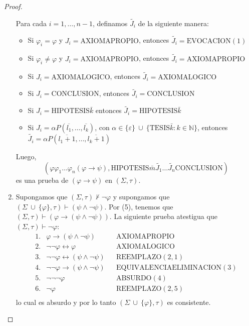 \begin{proof}
\begin{enumerate}[(1)]
        \PN Para cada $i = 1, \dotsc, n-1$, definamos $\widetilde{J_{i}}$ de la siguiente manera:
        \begin{itemize}
          \item Si $\varphi_{i} = \varphi $ y $J_{i} = \mathrm{AXIOMAPROPIO}$, entonces $\widetilde{J_{i}} =
            \mathrm{EVOCACION}(1)$
          \item Si $\varphi_{i}\neq \varphi $ y $J_{i} = \mathrm{AXIOMAPROPIO}$, entonces $\widetilde{J_{i}} =
            \mathrm{AXIOMAPROPIO}$
          \item Si $J_{i} = \mathrm{AXIOMALOGICO}$, entonces $\widetilde{J_{i}}= \mathrm{AXIOMALOGICO}$
          \item Si $J_{i} = \mathrm{CONCLUSION}$, entonces $\widetilde{J_{i}} = \mathrm{CONCLUSION}$
          \item Si $J_{i} = \mathrm{HIPOTESIS}\bar{k}$ entonces $\widetilde{J_{i}}= \mathrm{HIPOTESIS}\bar{k}$
          \item Si $J_{i} = \alpha P(\overline{l_{1}}, \dotsc, \overline{l_{k}})$, con $\alpha \in \{\varepsilon\}
            \ \cup \ \{\mathrm{TESIS}\bar{k}: k \in \mathbb{N}\}$, entonces $\widetilde{J_{i}} = \alpha
            P(\overline{l_{1}+1}, \dotsc, \overline{l_{k}+1})$
        \end{itemize}

        \PN Luego,
        \[
          (\varphi \varphi_{1} \dotsc \varphi_{n} (\varphi \rightarrow \psi), \text{HIPOTESIS}\bar{m} \widetilde{J_{1}}
          \dotsc \widetilde{J_{n}} \text{CONCLUSION})
        \]
        \PN es una prueba de $(\varphi \rightarrow \psi)$ en $(\Sigma, \tau)$.

      \item Supongamos que $(\Sigma, \tau) \not\vdash \lnot \varphi$ y supongamos que $(\Sigma \ \cup \ \{\varphi\},
        \tau) \vdash (\psi \wedge \lnot \psi)$. Por (5), tenemos que $(\Sigma, \tau) \vdash (\varphi \rightarrow (\psi
        \wedge \lnot \psi))$. La siguiente prueba atestigua que $(\Sigma, \tau) \vdash \lnot \varphi$:
        \[
          \begin{array}{llll}
            1. & \varphi \rightarrow (\psi \wedge \lnot \psi) && \text{AXIOMAPROPIO} \\
            2. & \lnot\lnot\varphi \leftrightarrow \varphi && \text{AXIOMALOGICO} \\
            3. & \lnot\lnot\varphi \leftrightarrow (\psi \wedge \lnot \psi) && \text{REEMPLAZO}(2,1) \\
            4. & \lnot\lnot\varphi \rightarrow (\psi \wedge \lnot \psi) && \text{EQUIVALENCIAELIMINACION}(3) \\
            5. & \lnot\lnot\lnot\varphi && \text{ABSURDO}(4) \\
            6. & \lnot\varphi && \text{REEMPLAZO}(2,5) \\
          \end{array}
        \]
        \PN lo cual es absurdo y por lo tanto $(\Sigma \ \cup \ \{\varphi\}, \tau)$ es consistente.
    \end{enumerate}
  \end{proof}

